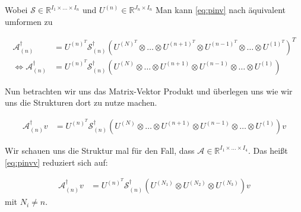 Wobei $\mathcal{S} \in \mathbb{R}^{I_{1} \times \dots \times I_{n}}$ und $U^{(n)} \in \mathbb{R}^{J_{n} \times I_{n}}$
Man kann \ref{eq:pinv} nach \cite[462]{Kolda} äquivalent umformen zu

\begin{equation}
\begin{aligned}
\mathcal{A}^{\dagger}_{(n)}  &= U^{ (n) ^{T} }  \mathcal{S}^{\dagger}_{(n)} ( U^{ (N) ^{T} } \otimes \dots \otimes U^{ (n+1) ^{T} } \otimes U^{ (n-1) ^{T} } \otimes \dots \otimes U^{ (1) ^{T} })^{T} \\ \iff
\mathcal{A}^{\dagger}_{(n)} &= U^{ (n) ^{T} }  \mathcal{S}^{\dagger}_{(n)} ( U^{ (N)  } \otimes \dots \otimes U^{ (n+1) } \otimes U^{ (n-1) } \otimes \dots \otimes U^{ (1) })
\end{aligned}
\end{equation}

Nun betrachten wir uns das Matrix-Vektor Produkt und überlegen uns wie wir uns die Strukturen dort zu nutze machen.

\begin{equation} \label{eq:pinvv}
\begin{aligned}
\mathcal{A}^{\dagger}_{(n)}v&= U^{ (n) ^{T} }  \mathcal{S}^{\dagger}_{(n)} ( U^{ (N)  } \otimes \dots \otimes U^{ (n+1) } \otimes U^{ (n-1) } \otimes \dots \otimes U^{ (1) }) v
\end{aligned}
\end{equation}

Wir schauen uns die Struktur mal für den Fall, dass $\mathcal{A} \in \mathbb{R}^{I_{1} \times \dots \times I_{4}}$. Das heißt \ref{eq:pinvv} reduziert sich auf:

\begin{equation} \label{eq:pinvcase}
\begin{aligned}
\mathcal{A}^{\dagger}_{(n)}v&= U^{ (n) ^{T} }  \mathcal{S}^{\dagger}_{(n)} ( U^{ (N_{1})  } \otimes U^{ (N_{2})}  \otimes U^{ (N_{3}) }) v
\end{aligned}
\end{equation}
mit $N_{i} \neq n$.

